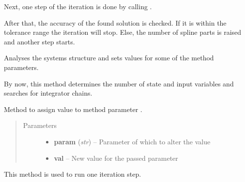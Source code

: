 \documentclass[letterpaper,10pt,english]{sphinxmanual}
\begin{document}
\begin{fulllineitems}
\begin{fulllineitems}
Next, one step of the iteration is done by calling {\hyperref[pytrajectory:pytrajectory.trajectory.Trajectory.iterate]{}}.

After that, the accuracy of the found solution is checked.
If it is within the tolerance range the iteration will stop.
Else, the number of spline parts is raised and another step starts.

\end{fulllineitems}


\begin{fulllineitems}
\label{pytrajectory:pytrajectory.trajectory.Trajectory.analyseSystem}
Analyses the systems structure and sets values for some of the method
parameters.

By now, this method determines the number of state and input variables
and searches for integrator chains.

\end{fulllineitems}


\begin{fulllineitems}
\label{pytrajectory:pytrajectory.trajectory.Trajectory.setParam}
Method to assign value  to method parameter .
\begin{quote}\begin{description}
\item[{Parameters}] \leavevmode\begin{itemize}
\item {} 
\textbf{param} (\emph{str}) -- Parameter of which to alter the value

\item {} 
\textbf{val} -- New value for the passed parameter

\end{itemize}

\end{description}\end{quote}

\end{fulllineitems}


\begin{fulllineitems}
\label{pytrajectory:pytrajectory.trajectory.Trajectory.iterate}
This method is used to run one iteration step.


\end{fulllineitems}
\end{fulllineitems}
\end{document}
